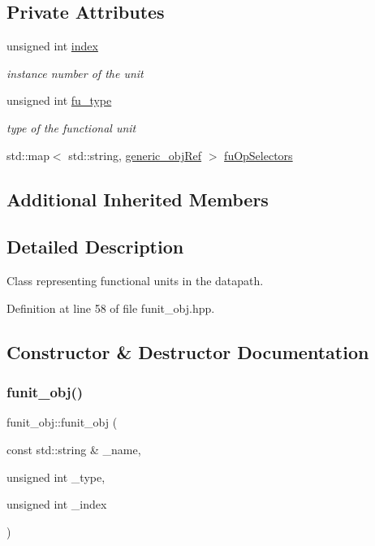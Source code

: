 \subsection*{Private Attributes}
\begin{DoxyCompactItemize}
\item 
unsigned int \hyperlink{classfunit__obj_a085b6db5c30586a80109c3e520ac31f8}{index}
\begin{DoxyCompactList}\small\item\em instance number of the unit \end{DoxyCompactList}\item 
unsigned int \hyperlink{classfunit__obj_a107db9aec0bbc47ee439130c0841b986}{fu\+\_\+type}
\begin{DoxyCompactList}\small\item\em type of the functional unit \end{DoxyCompactList}\item 
std\+::map$<$ std\+::string, \hyperlink{generic__obj_8hpp_acb533b2ef8e0fe72e09a04d20904ca81}{generic\+\_\+obj\+Ref} $>$ \hyperlink{classfunit__obj_ad90a1f58ef6389e0e1fcf2619fc54ce8}{fu\+Op\+Selectors}
\end{DoxyCompactItemize}
\subsection*{Additional Inherited Members}


\subsection{Detailed Description}
Class representing functional units in the datapath. 

Definition at line 58 of file funit\+\_\+obj.\+hpp.



\subsection{Constructor \& Destructor Documentation}
\mbox{\label{classfunit__obj_a7ebd13baff863eb4df6277e64e915be0}} 
\subsubsection{\texorpdfstring{funit\+\_\+obj()}{funit\_obj()}}
{\footnotesize\ttfamily funit\+\_\+obj\+::funit\+\_\+obj (\begin{DoxyParamCaption}\item[{const std\+::string \&}]{\+\_\+name,  }\item[{unsigned int}]{\+\_\+type,  }\item[{unsigned int}]{\+\_\+index }\end{DoxyParamCaption})\hspace{0.3cm}{\ttfamily [inline]}}



